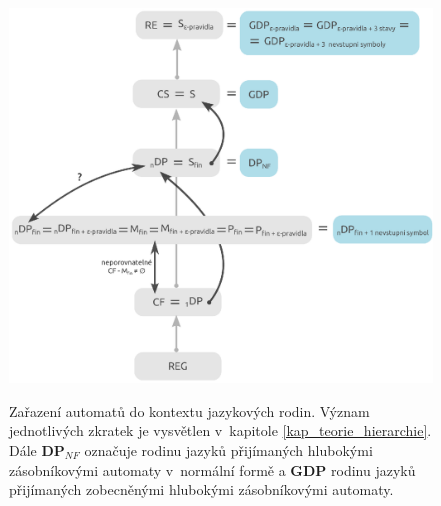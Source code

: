 \begin{figure}[ht]
\centering
\includegraphics{img/bp_hierarchy03.eps} \bigskip \\
\caption{Zařazení automatů do kontextu jazykových rodin. Význam jednotlivých zkratek je vysvětlen v~kapitole \ref{kap_teorie_hierarchie}. Dále \textbf{DP${}_{NF}$} označuje rodinu jazyků přijímaných hlubokými zásobníkovými automaty v~normální formě a \textbf{GDP} rodinu jazyků přijímaných zobecněnými hlubokými zásobníkovými automaty.}
\label{obr_model02_hierarchy}
\end{figure}


